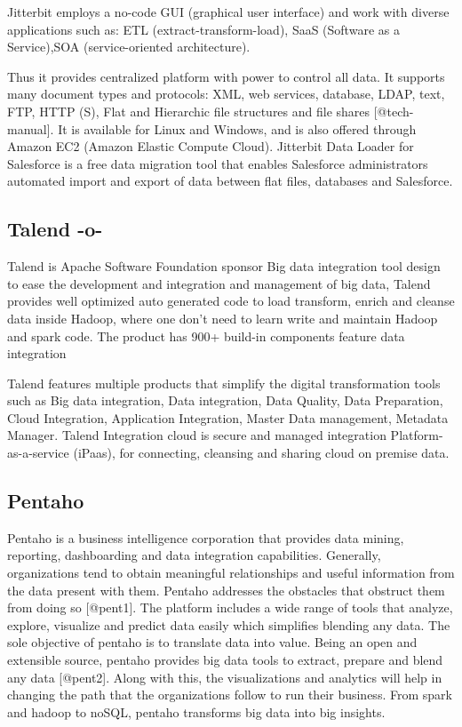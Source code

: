 Jitterbit employs a no-code GUI (graphical user interface) and work
with diverse applications such as: ETL (extract-transform-load), SaaS
(Software as a Service),SOA (service-oriented architecture).

Thus it provides centralized platform with power to control all
data. It supports many document types and protocols: XML, web
services, database, LDAP, text, FTP, HTTP (S), Flat and Hierarchic
file structures and file shares [@tech-manual]. It is available
for Linux and Windows, and is also offered through Amazon EC2 (Amazon
Elastic Compute Cloud). Jitterbit Data Loader for Salesforce is a free
data migration tool that enables Salesforce administrators automated
import and export of data between flat files, databases and
Salesforce.



\subsection{Talend -o-}

Talend is Apache Software Foundation sponsor Big data integration tool
design to ease the development and integration and management of big
data, Talend provides well optimized auto generated code to load
transform, enrich and cleanse data inside Hadoop, where one don't need
to learn write and maintain Hadoop and spark code.  The product has
900+ build-in components feature data integration
     
Talend features multiple products that simplify the digital
transformation tools such as Big data integration, Data integration,
Data Quality, Data Preparation, Cloud Integration, Application
Integration, Master Data management, Metadata Manager.  Talend
Integration cloud is secure and managed integration
Platform-as-a-service (iPaas), for connecting, cleansing and sharing
cloud on premise data.



\subsection{Pentaho}

Pentaho is a business intelligence corporation that provides data
mining, reporting, dashboarding and data integration
capabilities. Generally, organizations tend to obtain meaningful
relationships and useful information from the data present with
them. Pentaho addresses the obstacles that obstruct them from doing so
[@pent1]. The platform includes a wide range of tools that
analyze, explore, visualize and predict data easily which simplifies
blending any data. The sole objective of pentaho is to translate data
into value. Being an open and extensible source, pentaho provides big
data tools to extract, prepare and blend any data
[@pent2]. Along with this, the visualizations and analytics will
help in changing the path that the organizations follow to run their
business. From spark and hadoop to noSQL, pentaho transforms big data
into big insights.

